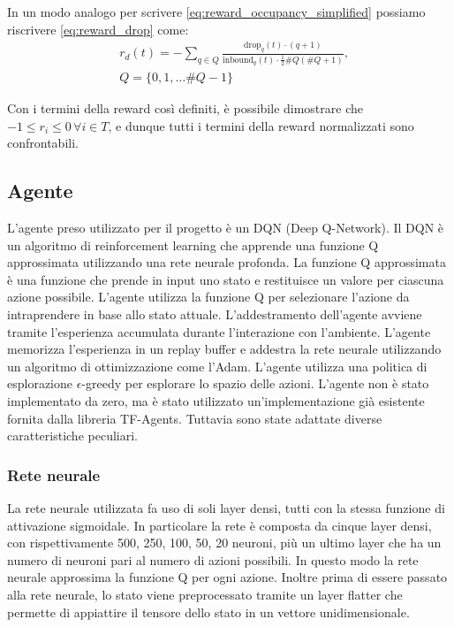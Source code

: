 \documentclass[conference]{IEEEtran}
\begin{document}
In un modo analogo per scrivere \autoref{eq:reward_occupancy_simplified} possiamo
riscrivere \autoref{eq:reward_drop} come:
\begin{equation}
    \begin{aligned}
        & r_d(t) = -\sum_{q \in Q}\frac{\text{drop}_q(t) \cdot (q + 1)}{\text{inbound}_q(t) \cdot \frac{1}{2}\#Q(\#Q + 1)},\\
        & Q = \{0, 1, \dots \#Q - 1\} 
    \end{aligned}
\end{equation}

Con i termini della reward così definiti, è possibile dimostrare che $ -1 \leq r_i \leq 0 \, \forall i \in T$, e dunque tutti i termini della reward normalizzati sono 
confrontabili.

\subsection{Agente}
L'agente preso utilizzato per il progetto è un DQN (Deep Q-Network). Il DQN è un algoritmo di reinforcement learning che apprende una funzione Q approssimata utilizzando una rete neurale profonda. La funzione Q approssimata è una funzione che prende in input uno stato e restituisce un valore per ciascuna azione possibile. L'agente utilizza la funzione Q per selezionare l'azione da intraprendere in base allo stato attuale. L'addestramento dell'agente avviene tramite l'esperienza accumulata durante l'interazione con l'ambiente. L'agente memorizza l'esperienza in un replay buffer e addestra la rete neurale utilizzando un algoritmo di ottimizzazione come l'Adam. L'agente utilizza una politica di esplorazione $\epsilon$-greedy per esplorare lo spazio delle azioni. L'agente non è stato implementato da zero, ma è stato utilizzato un'implementazione già esistente fornita dalla libreria TF-Agents.
Tuttavia sono state adattate diverse caratteristiche peculiari.
\subsubsection{Rete neurale}
La rete neurale utilizzata fa uso di soli layer densi, tutti con la stessa funzione di attivazione sigmoidale. In particolare la rete è composta da cinque layer densi, con rispettivamente 500, 250, 100, 50, 20 neuroni, più un ultimo layer che ha un numero di neuroni pari al numero di azioni possibili. In questo modo la rete neurale approssima la funzione Q per ogni azione. Inoltre prima di essere passato alla rete neurale, lo stato viene preprocessato tramite un layer flatter che permette di appiattire il tensore dello stato in un vettore unidimensionale. 
\end{document}
